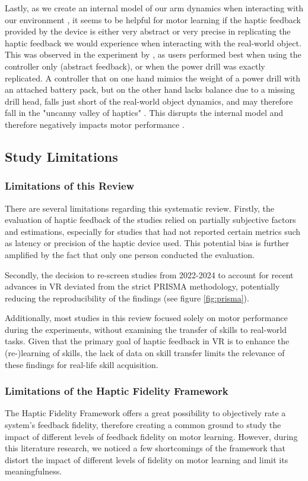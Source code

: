 Lastly, as we create an internal model of our arm dynamics when interacting with our environment \cite{Pierella2019TheModels}, it seems to be helpful for motor learning if the haptic feedback provided by the device is either very abstract or very precise in replicating the haptic feedback we would experience when interacting with the real-world object. This was observed in the experiment by \cite{Yang2023}, as users performed best when using the controller only (abstract feedback), or when the power drill was exactly replicated. A controller that on one hand mimics the weight of a power drill with an attached battery pack, but on the other hand lacks balance due to a missing drill head, falls just short of the real-world object dynamics, and may therefore fall in the "uncanny valley of haptics" \cite{Berger2018TheHaptics}. This disrupts the internal model and therefore negatively impacts motor performance \cite{Yang2023}. 


\subsection{Study Limitations}

\subsubsection{Limitations of this Review}
There are several limitations regarding this systematic review.
Firstly, the evaluation of haptic feedback of the studies relied on partially subjective factors and estimations, especially for studies that had not reported certain metrics such as latency or precision of the haptic device used. This potential bias is further amplified by the fact that only one person conducted the evaluation.

Secondly, the decision to re-screen studies from 2022-2024 to account for recent advances in VR deviated from the strict PRISMA methodology, potentially reducing the reproducibility of the findings (see figure \ref{fig:prisma}).

Additionally, most studies in this review focused solely on motor performance during the experiments, without examining the transfer of skills to real-world tasks. Given that the primary goal of haptic feedback in VR is to enhance the (re-)learning of skills, the lack of data on skill transfer limits the relevance of these findings for real-life skill acquisition.


\subsubsection{Limitations of the Haptic Fidelity Framework}
The Haptic Fidelity Framework offers a great possibility to objectively rate a system's feedback fidelity, therefore creating a common ground to study the impact of different levels of feedback fidelity on motor learning. However, during this literature research, we noticed a few shortcomings of the framework that distort the impact of different levels of fidelity on motor learning and limit its meaningfulness.


